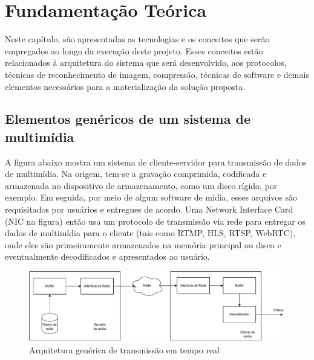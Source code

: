 \documentclass[12pt, %
openright, 
oneside, %
a4paper,    %
brazil]{facom-ufu-abntex2}
\begin{document}


\chapter{Fundamentação Teórica}

Neste capítulo, são apresentadas as tecnologias e os conceitos que serão
empregados ao longo da execução deste projeto. Esses conceitos estão
relacionados à arquitetura do sistema que será desenvolvido, aos protocolos,
técnicas de reconhecimento de imagem, compressão, técnicas de software e demais
elementos necessários para a materialização da solução proposta.

\section{Elementos genéricos de um sistema de multimídia}

A figura abaixo mostra um sistema de cliente-servidor para transmissão de dados
de multimídia. Na origem, tem-se a gravação comprimida, codificada e armazenada
no dispositivo de armazenamento, como um disco rígido, por exemplo. Em seguida,
por meio de algum software de mídia, esses arquivos são requisitados por
usuários e entregues de acordo. Uma Network Interface Card (NIC na figura)
então usa um protocolo de transmissão via rede para entregar os dados de
multimídia para o cliente (tais como RTMP, HLS, RTSP, WebRTC), onde eles são
primeiramente armazenados na memória principal ou disco e eventualmente
decodificados e apresentados ao usuário.

\begin{figure}[!ht]
	\centering
	\includegraphics[width=1\linewidth]{media_fundamentals.pdf}
	\caption[Representação de um arquitetura de tempo real genérica]{Arquitetura genérica de transmissão em tempo real}
	\label{fig:graficosVariandoTamanhoRede}
\end{figure}
\end{document}
